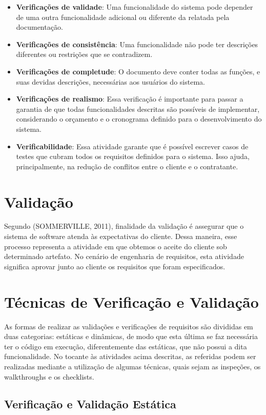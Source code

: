 \documentclass[runningheads]{llncs}
\begin{document}
\begin{itemize}
    \item \textbf{Verificações de validade}: Uma funcionalidade do sistema pode depender de uma outra funcionalidade adicional ou diferente da relatada pela documentação.
    \item \textbf{Verificações de consistência}: Uma funcionalidade não pode ter descrições diferentes ou restrições que se contradizem.
    \item\textbf{Verificações de completude}: O documento deve conter todas as funções, e suas devidas descrições, necessárias aos usuários do sistema.
    \item \textbf{Verificações de realismo}: Essa verificação é importante para passar a garantia de que todas funcionalidades descritas são possíveis de implementar, considerando o orçamento e o cronograma definido para o desenvolvimento do sistema.
    \item \textbf{Verificabilidade}: Essa atividade garante que é possível escrever casos de testes que cubram todos os requisitos definidos para o sistema. Isso ajuda, principalmente, na redução de conflitos entre o cliente e o contratante.
\end{itemize}

\section{Validação}
Segundo (SOMMERVILLE, 2011)\cite{ref_book2}, finalidade da validação é assegurar que o sistema de software atenda às expectativas do cliente. Dessa maneira, esse processo representa a atividade em que obtemos o aceite do cliente sob determinado artefato. No cenário de engenharia de requisitos, esta atividade significa aprovar junto ao cliente os requisitos que foram especificados.

\section{Técnicas de Verificação e Validação}
As formas de realizar as validações e verificações de requisitos são divididas em duas categorias: estáticas e dinâmicas, de modo que esta última se faz necessária ter o código em execução, diferentemente das estáticas, que não possui a dita funcionalidade. No tocante às atividades acima descritas, as referidas podem ser realizadas mediante a utilização de algumas técnicas, quais sejam as inspeções, os walkthroughs e os checklists.

\subsection{Verificação e Validação Estática}
\end{document}
